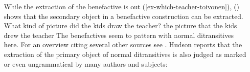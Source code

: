 While the extraction of the benefactive is out (\ref{ex-which-teacher-toivonen}), () shows that the secondary object in
a benefactive construction can be extracted.
\eal
\label{ex-extraction-secondary-object}
\ex What kind of picture did the kids draw the teacher? 
\ex the picture that the kids drew the teacher 
\zl
The benefactives seem to pattern with normal ditransitives here. For an overview citing several
other sources see \citealp[]{Hudson92a-u}. Hudson reports that the extraction of the primary object of normal ditransitives is also
judged as marked or even ungrammatical by many authors and subjects:
\eal
\judgewidth{\%}
\zl

